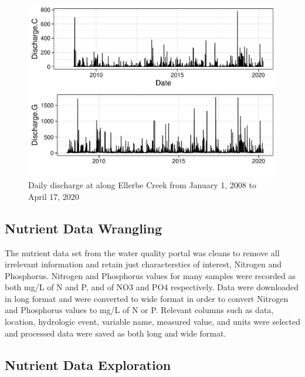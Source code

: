 \documentclass[12pt,]{article}
\begin{document}
\begin{figure}
\centering
\includegraphics{Landman_ENV872_Project_files/figure-latex/Exploratory Analysis Figure 3-1.pdf}
\caption{Daily discharge at along Ellerbe Creek from January 1, 2008 to
April 17, 2020}
\end{figure}

\newpage

\hypertarget{nutrient-data-wrangling}{%
\subsection{Nutrient Data Wrangling}\label{nutrient-data-wrangling}}

The nutrient data set from the water quality portal was cleans to remove
all irrelevant information and retain just characterstics of interest,
Nitrogen and Phosphorus. Nitrogen and Phosphorus values for many samples
were recorded as both mg/L of N and P, and of NO3 and PO4 respectively.
Data were downloaded in long format and were converted to wide format in
order to convert Nitrogen and Phosphorus values to mg/L of N or P.
Relevant columns such as data, location, hydrologic event, variable
name, measured value, and units were selected and processed data were
saved as both long and wide format.

\hypertarget{nutrient-data-exploration}{%
\subsection{Nutrient Data Exploration}\label{nutrient-data-exploration}}
\end{document}
